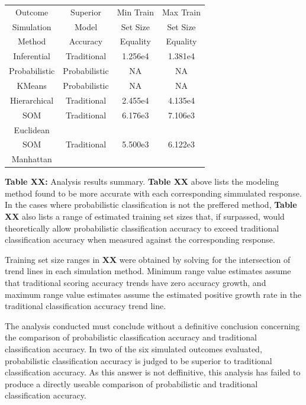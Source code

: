 \documentclass[12pt,]{article}
\begin{document}
\begin{center}
\begin{tabular}{|c||c|c|c|}
\hline
Outcome       &  Superior     &  Min Train   &  Max Train \\
Simulation    &  Model        &  Set Size    &  Set Size  \\  
Method        &  Accuracy     &  Equality    &  Equality  \\  
\hline
\hline
Inferential   & Traditional   &  1.256e4     &  1.381e4    \\
\hline 
Probabilistic & Probabilistic &  NA          &  NA          \\
\hline
KMeans        & Probabilistic &  NA          &  NA          \\
\hline
Hierarchical  & Traditional   &  2.455e4     &  4.135e4     \\
\hline
SOM           & Traditional   &  6.176e3     &  7.106e3     \\
Euclidean     &               &              &              \\
\hline
SOM           & Traditional   &  5.500e3     &  6.122e3     \\
Manhattan     &               &              &              \\
\hline
\end{tabular}
\end{center}

\textbf{Table XX:} Analysis results summary. \textbf{Table XX} above
lists the modeling method found to be more accurate with each
corresponding simmulated response. In the cases where probabilistic
classification is not the preffered method, \textbf{Table XX} also lists
a range of estimated training set sizes that, if surpassed, would
theoretically allow probabilistic classification accuracy to exceed
traditional classification accuracy when measured against the
corresponding response.

Training set size ranges in \textbf{XX} were obtained by solving for the
intersection of trend lines in each simulation method. Minimum range
value estimates assume that traditional scoring accuracy trends have
zero accuracy growth, and maximum range value estimates assume the
estimated positive growth rate in the traditional classification
accuracy trend line.

The analysis conducted must conclude without a definitive conclusion
concerning the comparison of probabilistic classification accuracy and
traditional classification accuracy. In two of the six simulated
outcomes evaluated, probabilistic classification accuracy is judged to
be superior to traditional classification accuracy. As this answer is
not deffinitive, this analysis has failed to produce a directly useable
comparison of probabilistic and traditional classification accuracy.
\end{document}
